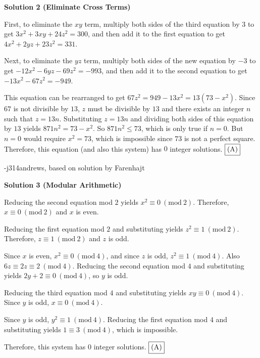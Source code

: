 \begin{enumerate}
 



\textbf{Solution 2 (Eliminate Cross Terms)}

First, to eliminate the $xy$ term, multiply both sides of the third equation by $3$ to get $3x^2 + 3xy + 24z^2 = 300$, and then add it to the first equation to get $4x^2 + 2yz + 23z^2 = 331$.  

 Next, to eliminate the $yz$ term, multiply both sides of the new equation by $-3$ to get $-12x^2 - 6yz - 69z^2 = -993$, and then add it to the second equation to get $-13x^2 - 67z^2 = -949$.  

 This equation can be rearranged to get $67z^2 = 949-13x^2 = 13(73-x^2)$.  Since $67$ is not divisible by $13$, $z$ must be divisible by $13$ and there exists an integer $n$ such that $z = 13n$.  Substituting $z = 13n$ and dividing both sides of this equation by $13$ yields $871n^2 = 73 - x^2$.  So $871n^2 \leq 73$, which is only true if $n = 0$.  But $n = 0$ would require $x^2 = 73$, which is impossible since $73$ is not a perfect square.  Therefore, this equation (and also this system) has $0$ integer solutions. $\fbox{(A)}$

 -j314andrews, based on solution by Farenhajt

 



\textbf{Solution 3 (Modular Arithmetic)}

Reducing the second equation mod $2$ yields $x^2 \equiv 0\ (\mathrm{mod}\ 2)$.  Therefore, $x \equiv 0\ (\mathrm{mod}\ 2)$ and $x$ is even.

 Reducing the first equation mod $2$ and substituting yields $z^2 \equiv 1\ (\mathrm{mod}\ 2)$.  Therefore, $z \equiv 1\ (\mathrm{mod}\ 2)$ and $z$ is odd.

 Since $x$ is even, $x^2 \equiv 0\ (\mathrm{mod}\ 4)$, and since $z$ is odd, $z^2 \equiv 1\ (\mathrm{mod}\ 4)$. Also $6z \equiv 2z \equiv 2\ (\mathrm{mod}\ 4)$. Reducing the second equation mod $4$ and substituting yields $2y + 2 \equiv 0\ (\mathrm{mod}\ 4)$, so $y$ is odd.

 Reducing the third equation mod $4$ and substituting yields $xy \equiv 0\ (\mathrm{mod}\ 4)$.  Since $y$ is odd, $x \equiv 0\ (\mathrm{mod}\ 4)$.  

 Since $y$ is odd, $y^2 \equiv 1\ (\mathrm{mod}\ 4)$.  Reducing the first equation mod $4$ and substituting yields $1 \equiv 3\ (\mathrm{mod}\ 4)$, which is impossible.

 Therefore, this system has $0$ integer solutions. $\fbox{(A)}$


\end{enumerate}
